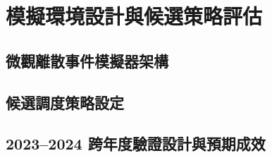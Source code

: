 
\chapter{模擬環境設計與候選策略評估}\label{chap:Simulation Setup & Policy Evaluation}

\section{微觀離散事件模擬器架構}

\section{候選調度策略設定}

\section{2023–2024 跨年度驗證設計與預期成效}
